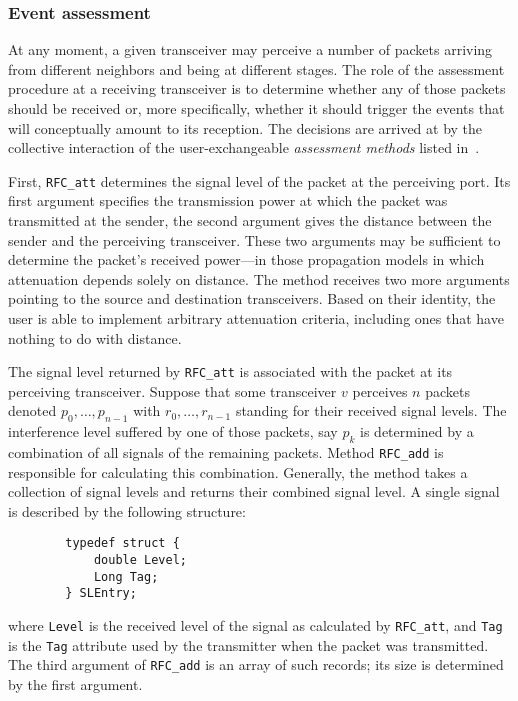 \subsubsection{Event assessment}
\label{rm_tr_ra_ea}

At any moment, a given transceiver may perceive a number of packets arriving
from different neighbors and being at different stages.
The role of the assessment procedure at a receiving transceiver is to
determine whether any of those packets should be received or, more
specifically, whether it should trigger the events that will conceptually
amount to its reception.
The decisions are arrived at by the collective interaction of the
user-exchangeable {\em assessment methods\/} listed in~.

First, {\tt RFC\_att} determines the signal level of the packet at the
perceiving port.
Its first argument specifies the transmission power at which
the packet was transmitted at the sender,
the second argument gives the distance between
the sender and the perceiving transceiver.
These two arguments may be sufficient to determine the packet's received
power---in those propagation models in which attenuation depends solely on
distance.
The method receives two more arguments pointing to the source and destination
transceivers.
Based on their identity, the user is able to implement arbitrary attenuation
criteria, including ones that have nothing to do with distance.

The signal level returned by {\tt RFC\_att} is associated with the packet
at its perceiving transceiver.
Suppose that some transceiver $v$ perceives $n$ packets denoted
$p_0, \ldots , p_{n-1}$ with $r_0, \ldots , r_{n-1}$ standing for their
received signal levels.
The interference level suffered by one of those packets,
say $p_k$ is determined by 
a combination of all signals of the remaining packets.
Method {\tt RFC\_add} is responsible for calculating this combination.
Generally, the method takes a collection of signal levels and returns
their combined signal level.
A single signal is described by the following structure:
\begin{verbatim}
        typedef struct {
            double Level;
            Long Tag;
        } SLEntry;
\end{verbatim}
\noindent
where {\tt Level} is the received level of the signal as calculated by
{\tt RFC\_att}, and {\tt Tag} is the {\tt Tag} attribute used by
the transmitter when the packet was transmitted.
The third argument of {\tt RFC\_add} is an array of such records; its size
is determined by the first argument.

